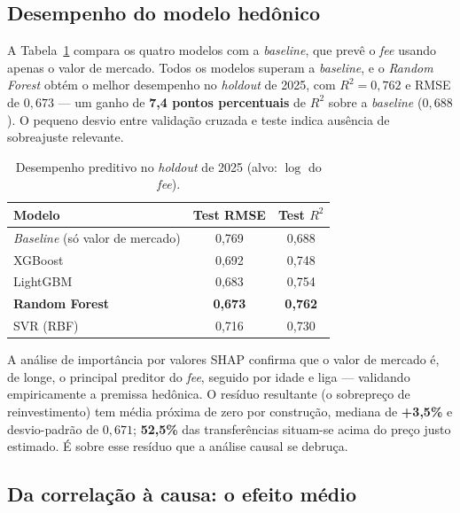 \documentclass[12pt]{article}
\begin{document}
\subsection{Desempenho do modelo hedônico}

A Tabela~\ref{tab:hedonico} compara os quatro modelos com a \textit{baseline}, que prevê o
\textit{fee} usando apenas o valor de mercado. Todos os modelos superam a \textit{baseline}, e o
\textit{Random Forest} obtém o melhor desempenho no \textit{holdout} de 2025, com $R^2 = 0{,}762$ e
RMSE de $0{,}673$ — um ganho de \textbf{7,4 pontos percentuais} de $R^2$ sobre a \textit{baseline}
($0{,}688$). O pequeno desvio entre validação cruzada e teste indica ausência de sobreajuste
relevante.

\begin{table}[ht]
\centering
\caption{Desempenho preditivo no \textit{holdout} de 2025 (alvo: $\log$ do \textit{fee}).}
\label{tab:hedonico}
\begin{tabular}{lcc}
\toprule
\textbf{Modelo} & \textbf{Test RMSE} & \textbf{Test $R^2$} \\
\midrule
\textit{Baseline} (só valor de mercado) & 0,769 & 0,688 \\
XGBoost                                  & 0,692 & 0,748 \\
LightGBM                                 & 0,683 & 0,754 \\
\textbf{Random Forest}                   & \textbf{0,673} & \textbf{0,762} \\
SVR (RBF)                                & 0,716 & 0,730 \\
\bottomrule
\end{tabular}
\end{table}

A análise de importância por valores SHAP \cite{lundberg2017} confirma que o valor de mercado é, de
longe, o principal preditor do \textit{fee}, seguido por idade e liga — validando empiricamente a
premissa hedônica. O resíduo resultante (o sobrepreço de reinvestimento) tem média próxima de zero
por construção, mediana de \textbf{+3,5\%} e desvio-padrão de $0{,}671$; \textbf{52,5\%} das
transferências situam-se acima do preço justo estimado. É sobre esse resíduo que a análise causal se
debruça.

\subsection{Da correlação à causa: o efeito médio}
\end{document}
